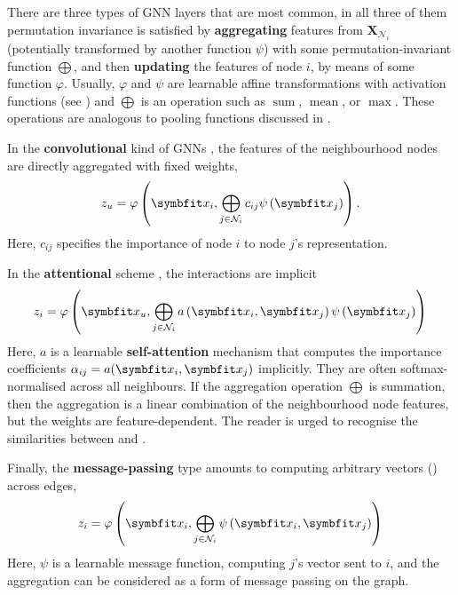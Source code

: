 There are three types of GNN layers that are most common, in all three of them permutation invariance is satisfied by \textbf{aggregating} features from $\symbf{X}_{\mathcal{N}_i}$ (potentially transformed by another function $\psi$) with some permutation-invariant function $\bigoplus$, and then \textbf{updating} the features of node $i$, by means of some function $\varphi$. Usually, $\varphi$ and $\psi$ are learnable affine transformations with activation functions (see ) and $\bigoplus$ is an operation such as $\operatorname{sum}$, $\operatorname{mean}$, or $\operatorname{max}$. These operations are analogous to pooling functions discussed in .

In the \textbf{convolutional} kind of GNNs \parencite{kipf2016semi}, the features of the neighbourhood nodes are directly aggregated with fixed weights,
\begin{equation}
    z_{u}=\varphi\left(\bfitx_{i}, \bigoplus_{j \in \mathcal{N}_{i}} c_{i j} \psi\left(\bfitx_{j}\right)\right).
    \label{eqn:gcn}
\end{equation}
Here, $c_{ij}$ specifies the importance of node $i$ to node $j$'s representation.

In the \textbf{attentional} scheme \parencite{velic018graph, brody2021attentive}, the interactions are implicit
\begin{equation}
z_{i}=\varphi\left(\bfitx_{u}, \bigoplus_{j \in \mathcal{N}_{i}} a\left(\bfitx_{i}, \bfitx_{j}\right) \psi\left(\bfitx_{j}\right)\right)
\label{eqn:attn-gnn}
\end{equation}
Here, $a$ is a learnable \textbf{self-attention} mechanism that computes the importance coefficients $\alpha_{ij} = a(\bfitx_i,\bfitx_j)$ implicitly. They are often softmax-normalised across all neighbours. If the aggregation operation $\bigoplus$ is summation, then the aggregation is a linear combination of the neighbourhood node features, but the weights are feature-dependent. The reader is urged to recognise the similarities between  and .

Finally, the \textbf{message-passing} type amounts to computing arbitrary vectors () across edges,
\begin{equation}
    z_{i}=\varphi\left(\bfitx_{i}, \bigoplus_{j \in \mathcal{N}_{i}} \psi\left(\bfitx_{i}, \bfitx_{j}\right)\right)
    \label{eqn:mesg-passing}
\end{equation}
Here, $\psi$ is a learnable message function, computing $j$'s vector sent to $i$, and the aggregation can be considered as a form of message passing on the graph.

